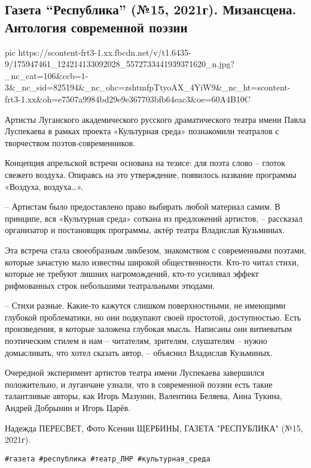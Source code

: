  
 
 
 
 

\subsection{Газета \enquote{Республика} (№15, 2021г).  Мизансцена.  Антология современной поэзии}
\label{sec:19_04_2021.fb.respublikalnr.3.poezia}

\ifcmt
  pic https://scontent-frt3-1.xx.fbcdn.net/v/t1.6435-9/175947461_124214133092028_5572733441939371620_n.jpg?_nc_cat=106&ccb=1-3&_nc_sid=825194&_nc_ohc=zshtmfpTtyoAX_4YiW9&_nc_ht=scontent-frt3-1.xx&oh=e7507a9984bd29e9e367703bfb64eac3&oe=60A4B10C
\fi

Артисты Луганского академического русского драматического театра имени Павла
Луспекаева в рамках проекта «Культурная среда» познакомили театралов с
творчеством поэтов-современников.

Концепция апрельской встречи основана на тезисе: для поэта слово – глоток
свежего воздуха. Опираясь на это утверждение, появилось название программы
«Воздуха, воздуха…».

– Артистам было предоставлено право выбирать любой материал самим. В принципе,
вся «Культурная среда» соткана из предложений артистов, – рассказал организатор
и постановщик программы, актёр театра Владислав Кузьминых.

Эта встреча стала своеобразным ликбезом, знакомством с современными поэтами,
которые зачастую мало известны широкой общественности. Кто-то читал стихи,
которые не требуют лишних нагромождений, кто-то усиливал эффект рифмованных
строк небольшими театральными этюдами.

– Стихи разные. Какие-то кажутся слишком поверхностными, не имеющими глубокой
проблематики, но они подкупают своей простотой, доступностью. Есть
произведения, в которые заложена глубокая мысль. Написаны они витиеватым
поэтическим стилем и нам – читателям, зрителям, слушателям – нужно домысливать,
что хотел сказать автор, – объяснил Владислав Кузьминых.

Очередной эксперимент артистов театра имени Луспекаева завершился положительно,
и луганчане узнали, что в современной поэзии есть такие талантливые авторы, как
Игорь Мазунин, Валентина Беляева, Анна Тукина, Андрей Добрынин и Игорь Царёв.

Надежда ПЕРЕСВЕТ, Фото Ксении ЩЕРБИНЫ, ГАЗЕТА "РЕСПУБЛИКА" (№15, 2021г).

\verb|#газета #республика #театр_ЛНР #культурная_среда|
